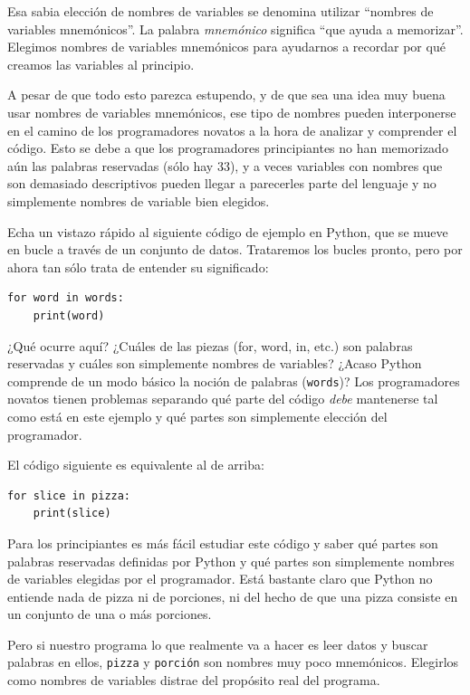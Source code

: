 Esa sabia elección de nombres de variables se denomina utilizar
``nombres de variables mnemónicos''. La palabra
\emph{mnemónico} significa ``que ayuda a memorizar''.
Elegimos nombres de variables mnemónicos para ayudarnos a recordar por
qué creamos las variables al principio.

A pesar de que todo esto parezca estupendo, y de que sea una idea muy
buena usar nombres de variables mnemónicos, ese tipo de nombres pueden
interponerse en el camino de los programadores novatos a la hora de
analizar y comprender el código. Esto se debe a que los programadores
principiantes no han memorizado aún las palabras reservadas (sólo hay
33), y a veces variables con nombres que son demasiado descriptivos
pueden llegar a parecerles parte del lenguaje y no simplemente nombres
de variable bien elegidos.

Echa un vistazo rápido al siguiente código de ejemplo en Python, que se
mueve en bucle a través de un conjunto de datos. Trataremos los bucles
pronto, pero por ahora tan sólo trata de entender su significado:

\begin{Verbatim}[frame=single]
for word in words:
    print(word)
\end{Verbatim}

¿Qué ocurre aquí? ¿Cuáles de las piezas (for, word, in, etc.) son
palabras reservadas y cuáles son simplemente nombres de variables?
¿Acaso Python comprende de un modo básico la noción de palabras
(\texttt{words})? Los programadores novatos tienen problemas separando
qué parte del código \emph{debe} mantenerse tal como está en este
ejemplo y qué partes son simplemente elección del programador.

El código siguiente es equivalente al de arriba:

\begin{Verbatim}[frame=single]
for slice in pizza:
    print(slice)
\end{Verbatim}

Para los principiantes es más fácil estudiar este código y saber qué
partes son palabras reservadas definidas por Python y qué partes son
simplemente nombres de variables elegidas por el programador. Está
bastante claro que Python no entiende nada de pizza ni de porciones, ni
del hecho de que una pizza consiste en un conjunto de una o más
porciones.

Pero si nuestro programa lo que realmente va a hacer es leer datos y
buscar palabras en ellos, \texttt{pizza} y \texttt{porción} son nombres
muy poco mnemónicos. Elegirlos como nombres de variables distrae del
propósito real del programa.

